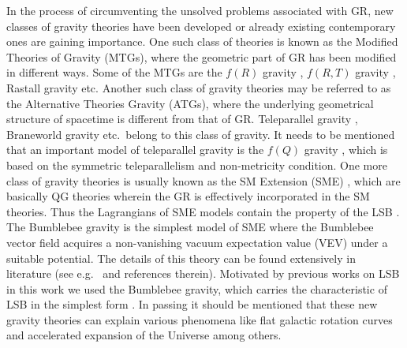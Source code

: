 \documentclass[aps,amsmath,amssymb,showpacs,showkeys]{revtex4}
\begin{document}

In the process of circumventing the unsolved problems associated with GR,  
new classes of gravity theories have been developed or already existing 
contemporary ones are gaining importance. One
such class of theories is known as the Modified Theories of Gravity (MTGs),
where the geometric part of GR has been modified in different ways. Some of
the MTGs are the $f(R)$ gravity \cite{51,52,521}, $f(R,T)$ gravity \cite{53},
Rastall gravity \cite{55} etc. Another such class of gravity theories may be
referred to as the Alternative Theories Gravity (ATGs), where the underlying
geometrical structure of spacetime is different from that of GR.
Teleparallel gravity \cite{tp}, Braneworld gravity \cite{bg} etc.\ belong to 
this class of gravity. It needs to be mentioned that an important model of
teleparallel gravity is the $f(Q)$ gravity \cite{54}, which is based on the
symmetric teleparallelism and non-metricity condition. One more class of
gravity theories is usually known as the SM Extension (SME) \cite{sme,sme2}, 
which are basically QG theories wherein the GR is effectively incorporated in 
the SM theories. Thus the Lagrangians of SME models contain the property of the 
LSB \cite{20}. The Bumblebee gravity is the simplest model of SME where the 
Bumblebee vector field acquires a non-vanishing vacuum expectation 
value (VEV) under a suitable potential. The details of this theory can be found
extensively in literature (see e.g.~\cite{17,18,19,20} and references
therein). Motivated by previous works on LSB  in this work we used the
Bumblebee gravity, which carries the characteristic of LSB in the simplest form
\cite{20}. In passing it should be mentioned that these new gravity theories
can explain various phenomena like flat galactic rotation curves \cite{56}
and accelerated expansion of the Universe \cite{12,13} among others.
\end{document}
